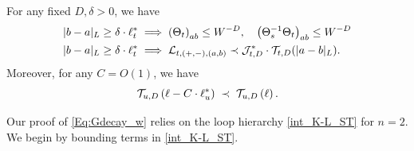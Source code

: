 \begin{lemma}\label{lem_dec_calE_0}
For any fixed $D,\delta>0$, we have
 \begin{align}
 \label{Kell*}
   |b -a|_{L}\ge \delta \cdot \ell_t^* &\implies 
   \left({\Theta}_t\right)_{ab } \le W^{-D} ,\quad    \left({\Theta}_s^{-1}{\Theta}_t\right)_{ab } \le W^{-D}
   \\
  |b -a|_{L}\ge \delta \cdot \ell_t^* 
 & \implies  {\cal L}_{t, (+,-),(a, b)} \prec {\cal J}^*_{t,D}\cdot{\cal T}_{t,D}(|a-b|_{L}) . \label{auiwii}
\end{align}
Moreover, for any $C=O(1)$, we have \begin{equation}\label{Tell*}
       { {\cal T}_{u,D} \left(\ell-C\cdot \ell_u^*\right)}\;\prec \;  {\cal T}_{u,D} \left(\ell \right).
\end{equation} 

\end{lemma}




Our proof of \eqref{Eq:Gdecay_w} relies on the loop hierarchy \eqref{int_K-L_ST} for $n=2$. 
We begin by bounding  terms in \eqref{int_K-L_ST}.  

